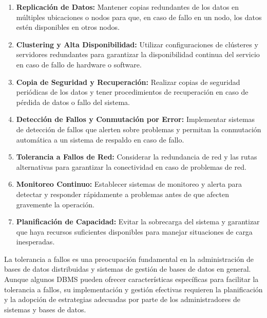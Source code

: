 \begin{enumerate}
	\item \textbf{Replicación de Datos:} Mantener copias redundantes de los datos en múltiples ubicaciones o nodos para que, en caso de fallo en un nodo, los datos estén disponibles en otros nodos.
	\item \textbf{Clustering y Alta Disponibilidad:} Utilizar configuraciones de clústeres y servidores redundantes para garantizar la disponibilidad continua del servicio en caso de fallo de hardware o software.
	\item \textbf{Copia de Seguridad y Recuperación:} Realizar copias de seguridad periódicas de los datos y tener procedimientos de recuperación en caso de pérdida de datos o fallo del sistema.
	\item \textbf{Detección de Fallos y Conmutación por Error:} Implementar sistemas de detección de fallos que alerten sobre problemas y permitan la conmutación automática a un sistema de respaldo en caso de fallo.
	\item \textbf{Tolerancia a Fallos de Red:} Considerar la redundancia de red y las rutas alternativas para garantizar la conectividad en caso de problemas de red.
	\item \textbf{Monitoreo Continuo:} Establecer sistemas de monitoreo y alerta para detectar y responder rápidamente a problemas antes de que afecten gravemente la operación.
	\item \textbf{Planificación de Capacidad:} Evitar la sobrecarga del sistema y garantizar que haya recursos suficientes disponibles para manejar situaciones de carga inesperadas.
\end{enumerate}
\begin{tcolorbox}[colback=yellow!10!white, colframe=blue!50!black, title=Resumiendo, coltitle=white]
	La tolerancia a fallos es una preocupación fundamental en la administración de bases de datos distribuidas y sistemas de gestión de bases de datos en general. Aunque algunos DBMS pueden ofrecer características específicas para facilitar la tolerancia a fallos, su implementación y gestión efectivas requieren la planificación y la adopción de estrategias adecuadas por parte de los administradores de sistemas y bases de datos.
\end{tcolorbox}

